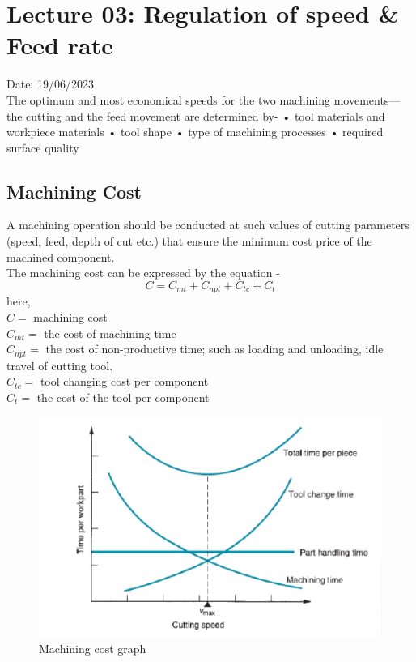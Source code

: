 \documentclass{article}
\begin{document}
\section{Lecture 03: Regulation of speed \& Feed rate} 
\hfill Date: 19/06/2023 \\

The optimum and most economical speeds for the two machining
movements—the cutting and the feed movement are determined by-
• tool materials and workpiece materials
• tool shape
• type of machining processes
• required surface quality

\subsection*{Machining Cost}
A machining operation should be conducted at such values of cutting
parameters (speed, feed, depth of cut etc.) that ensure the minimum
cost price of the machined component.\\
The machining cost can be expressed by the equation - 
$$C = C_{mt} + C_{npt} + C_{tc} + C_t$$
here,\\ 
$C =$ machining cost \\
$C_{mt} =$ the cost of machining time \\
$C_{npt} =$ the cost of non-productive time; such as loading and unloading, idle travel of cutting tool. \\
$C_{tc} =$ tool changing cost per component \\
$C_{t} =$ the cost of the tool per component \\

\begin{figure}[h]
  \begin{center}
    \includegraphics*[width=0.8\linewidth]{img/cost_func.jpeg}
    \caption{Machining cost graph}
  \end{center}
\end{figure}
\end{document}
